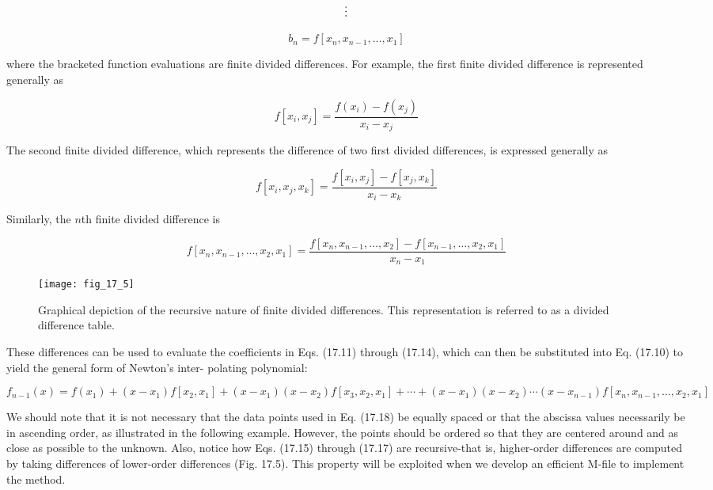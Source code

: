 \documentclass[../main.tex]{subfiles}
\begin{document}
\begin{equation}
	\notag
	\vdots 
\end{equation}

\begin{equation}
	\tag{17.14}
	b_n = f[x_n, x_{n-1}, \dots, x_1]
\end{equation}

\noindent where the bracketed function evaluations are finite divided differences. For example, the
first finite divided difference is represented generally as

\begin{equation}
	\tag{17.15}
	f[x_i, x_j] = \frac{f(x_i) - f(x_j)}{x_i - x_j}
\end{equation}

\noindent The second finite divided difference, which represents the difference of two first divided
differences, is expressed generally as

\begin{equation}
	\tag{17.16}
	f[x_i, x_j, x_k] = \frac{f[x_i, x_j] - f[x_j, x_k]}{x_i - x_k}
\end{equation}

\noindent Similarly, the $n$th finite divided difference is

\begin{equation}
	\tag{17.17}
	f[x_n,x_{n-1}, \dots, x_2, x_1] = \frac{f[x_n,x_{n-1}, \dots, x_2]- f[x_{n-1}, \dots, x_2, x_1]}{x_n - x_1}
\end{equation}

\begin{figure}[H] 
	\centering
	\texttt{[image: fig\_17\_5]}
	\caption{\textsf{Graphical depiction of the recursive nature of finite divided differences. This representation is
	referred to as a divided difference table.}}
	\label{fig:fig_17_5}
\end{figure}

\noindent These differences can be used to evaluate the coefficients in Eqs. (17.11) through (17.14),
which can then be substituted into Eq. (17.10) to yield the general form of Newton's inter-
polating polynomial:

\begin{equation}
	\tag{17.18}
	f_{n-1} (x) = f(x_1) + (x - x_1) f[x_2, x_1] + (x - x_1) (x - x_2) f[x_3,x_2,x_1] + \cdots + (x - x_1) (x - x_2) \cdots (x - x_{n-1}) f[x_n, x_{n-1}, \dots,x_2,x_1]
\end{equation}

We should note that it is not necessary that the data points used in Eq. (17.18) be
equally spaced or that the abscissa values necessarily be in ascending order, as illustrated
in the following example. However, the points should be ordered so that they are centered
around and as close as possible to the unknown. Also, notice how Eqs. (17.15) through
(17.17) are recursive-that is, higher-order differences are computed by taking differences
of lower-order differences (Fig. 17.5). This property will be exploited when we develop an
efficient M-file to implement the method.
\end{document}
